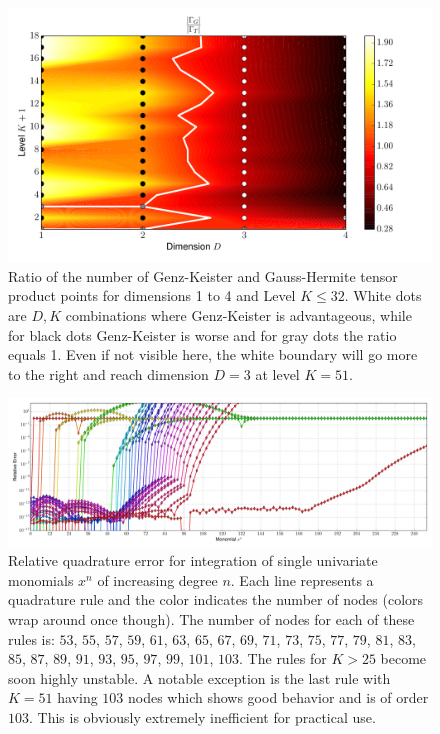 \documentclass[a4paper,10pt]{article}
\begin{document}
\begin{figure}[h]
  \centering
  \includegraphics[width=0.8\linewidth]{./img/gk_hermitephy_ratio_large.pdf}
  \caption{Ratio of the number of Genz-Keister and Gauss-Hermite tensor product
  points for dimensions 1 to 4 and Level $K \leq 32$. White dots are $D,K$
  combinations where Genz-Keister is advantageous, while for black dots
  Genz-Keister is worse and for gray dots the ratio equals 1. Even if not visible here,
  the white boundary will go more to the right and reach dimension $D = 3$ at level $K = 51$.}
  \label{fig:gk_hermitephy_ratio_large}
\end{figure}

\begin{figure}
  \centering
  \includegraphics[width=\linewidth]{./img/monomial_errors_hermitephy_high.pdf}
  \caption{Relative quadrature error for integration of single univariate monomials $x^n$ of increasing degree $n$.
  Each line represents a quadrature rule and the color indicates the number of nodes (colors wrap around once though).
  The number of nodes for each of these rules is:
  $53$, $55$, $57$, $59$, $61$, $63$, $65$, $67$, $69$, $71$, $73$, $75$,  $77$,
  $79$, $81$, $83$, $85$, $87$, $89$, $91$, $93$, $95$, $97$, $99$, $101$, $103$.
  The rules for $K > 25$ become soon highly unstable. A notable exception is the
  last rule with $K = 51$ having $103$ nodes which shows good behavior and
  is of order $103$. This is obviously extremely inefficient for practical
  use.}
  \label{fig:conv_monom_hermite_high}
\end{figure}
\end{document}
